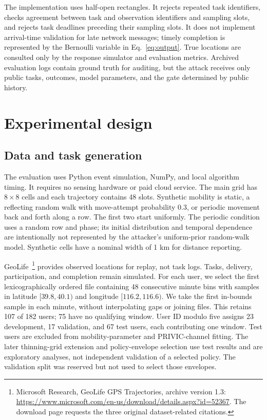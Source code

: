 \documentclass[review,12pt]{elsarticle}
\begin{document}
The implementation uses half-open rectangles. It rejects repeated task identifiers, checks agreement between task and observation identifiers and sampling slots, and rejects task deadlines preceding their sampling slots. It does not implement arrival-time validation for late network messages; timely completion is represented by the Bernoulli variable in Eq.~\eqref{eq:output}. True locations are consulted only by the response simulator and evaluation metrics. Archived evaluation logs contain ground truth for auditing, but the attack receives only public tasks, outcomes, model parameters, and the gate determined by public history.

\section{Experimental design}
\label{sec:experiments}
\subsection{Data and task generation}
The evaluation uses Python event simulation, NumPy, and local algorithm timing. It requires no sensing hardware or paid cloud service. The main grid has $8\times8$ cells and each trajectory contains 48 slots. Synthetic mobility is static, a reflecting random walk with move-attempt probability $0.3$, or periodic movement back and forth along a row. The first two start uniformly. The periodic condition uses a random row and phase; its initial distribution and temporal dependence are intentionally not represented by the attacker's uniform-prior random-walk model. Synthetic cells have a nominal width of 1 km for distance reporting.

GeoLife~\cite{geolife2009,geolife2008,geolife2010}\footnote{Microsoft Research, GeoLife GPS Trajectories, archive version 1.3: \url{https://www.microsoft.com/en-us/download/details.aspx?id=52367}. The download page requests the three original dataset-related citations.} provides observed locations for replay, not task logs. Tasks, delivery, participation, and completion remain simulated. For each user, we select the first lexicographically ordered file containing 48 consecutive minute bins with samples in latitude $[39.8,40.1)$ and longitude $[116.2,116.6)$. We take the first in-bounds sample in each minute, without interpolating gaps or joining files. This retains 107 of 182 users; 75 have no qualifying window. User ID modulo five assigns 23 development, 17 validation, and 67 test users, each contributing one window. Test users are excluded from mobility-parameter and PRIVIC-channel fitting. The later thinning-grid extension and policy-envelope selection use test results and are exploratory analyses, not independent validation of a selected policy. The validation split was reserved but not used to select those envelopes.
\end{document}
